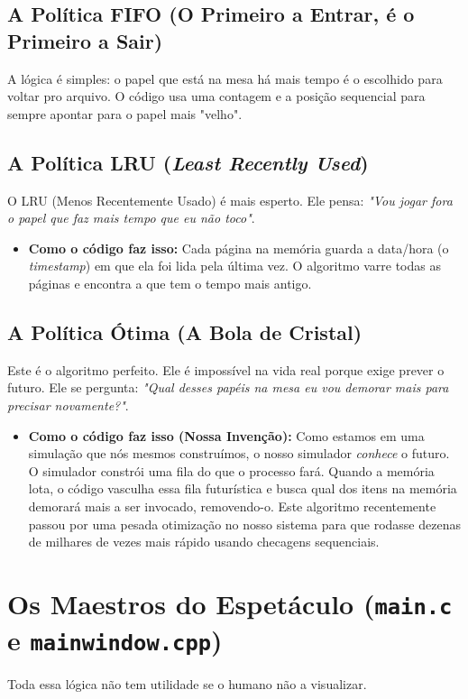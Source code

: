 \documentclass[12pt,a4paper]{article}
\begin{document}
\subsection{A Política FIFO (O Primeiro a Entrar, é o Primeiro a Sair)}
A lógica é simples: o papel que está na mesa há mais tempo é o escolhido para voltar pro arquivo. O código usa uma contagem e a posição sequencial para sempre apontar para o papel mais "velho".

\subsection{A Política LRU (\textit{Least Recently Used})}
O LRU (Menos Recentemente Usado) é mais esperto. Ele pensa: \textit{"Vou jogar fora o papel que faz mais tempo que eu não toco"}.
\begin{itemize}
    \item \textbf{Como o código faz isso:} Cada página na memória guarda a data/hora (o \textit{timestamp}) em que ela foi lida pela última vez. O algoritmo varre todas as páginas e encontra a que tem o tempo mais antigo.
\end{itemize}

\subsection{A Política Ótima (A Bola de Cristal)}
Este é o algoritmo perfeito. Ele é impossível na vida real porque exige prever o futuro. Ele se pergunta: \textit{"Qual desses papéis na mesa eu vou demorar mais para precisar novamente?"}.
\begin{itemize}
    \item \textbf{Como o código faz isso (Nossa Invenção):} Como estamos em uma simulação que nós mesmos construímos, o nosso simulador \textit{conhece} o futuro. O simulador constrói uma fila do que o processo fará. Quando a memória lota, o código vasculha essa fila futurística e busca qual dos itens na memória demorará mais a ser invocado, removendo-o. Este algoritmo recentemente passou por uma pesada otimização no nosso sistema para que rodasse dezenas de milhares de vezes mais rápido usando checagens sequenciais.
\end{itemize}

\section{Os Maestros do Espetáculo (\texttt{main.c} e \texttt{mainwindow.cpp})}
Toda essa lógica não tem utilidade se o humano não a visualizar. 
\end{document}
